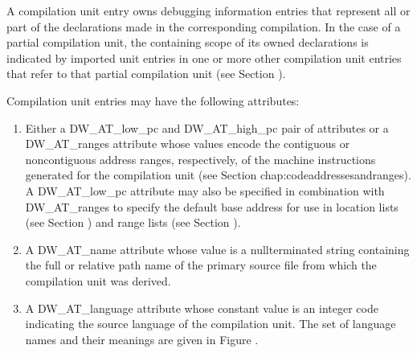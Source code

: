 A compilation unit entry owns debugging information
entries that represent all or part of the declarations
made in the corresponding compilation. In the case of a
partial compilation unit, the containing scope of its owned
declarations is indicated by imported unit entries in one
or more other compilation unit entries that refer to that
partial compilation unit (see 
Section ).


Compilation unit entries may have the following attributes:

\begin{enumerate}[1]
\item Either a DW\_AT\_low\_pc and DW\_AT\_high\_pc pair of
attributes or a DW\_AT\_ranges attribute whose values encode the
contiguous or non\dash contiguous address ranges, respectively,
of the machine instructions generated for the compilation
unit (see Section {chap:codeaddressesandranges}).  
A DW\_AT\_low\_pc attribute may also
be specified in combination with DW\_AT\_ranges to specify the
default base address for use in location lists (see Section
) and range lists 
(see Section ).

\item A DW\_AT\_name attribute whose value is a null\dash terminated
string containing the full or relative path name of the primary
source file from which the compilation unit was derived.

\item A DW\_AT\_language attribute whose constant value is an
integer code indicating the source language of the compilation
unit. The set of language names and their meanings are given
in 
Figure .


\end{enumerate}
